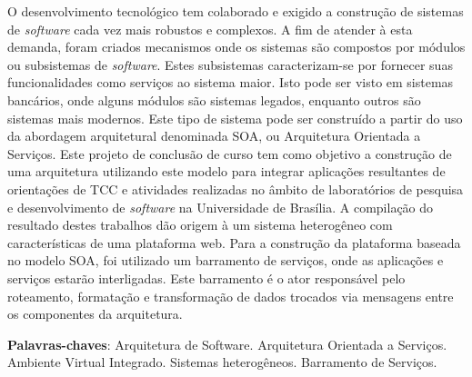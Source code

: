 \begin{resumo}

O desenvolvimento tecnológico tem colaborado e exigido a construção de sistemas de \textit{software} cada vez mais robustos e complexos. A fim de atender à esta demanda, foram criados mecanismos onde os sistemas são compostos por módulos ou subsistemas de \textit{software}. Estes subsistemas caracterizam-se por fornecer suas funcionalidades como serviços ao sistema maior. Isto pode ser visto em sistemas bancários, onde alguns módulos são sistemas legados, enquanto outros são sistemas mais modernos. Este tipo de sistema pode ser construído a partir do uso da abordagem arquitetural denominada SOA, ou Arquitetura Orientada a Serviços. Este projeto de conclusão de curso tem como objetivo a construção de uma arquitetura utilizando este modelo para integrar aplicações resultantes de orientações de TCC e atividades realizadas no âmbito de laboratórios de pesquisa e desenvolvimento de \textit{software} na Universidade de Brasília. A compilação do resultado destes trabalhos dão origem à um sistema heterogêneo com características de uma plataforma web. Para a construção da plataforma baseada no modelo SOA, foi utilizado um barramento de serviços, onde as aplicações e serviços estarão interligadas. Este barramento é o ator responsável pelo roteamento, formatação e transformação de dados trocados via mensagens entre os componentes da arquitetura.

 \vspace{\onelineskip}
    
 \noindent
 \textbf{Palavras-chaves}: Arquitetura de Software. Arquitetura Orientada a Serviços. Ambiente Virtual Integrado. Sistemas heterogêneos. Barramento de Serviços.
\end{resumo}
